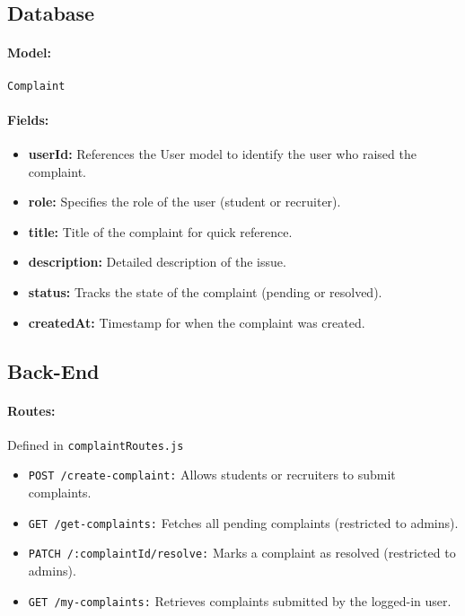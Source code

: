 \subsection*{Database}
\paragraph{Model:} \texttt{Complaint}
\paragraph{Fields:}
\begin{itemize}
    \item \textbf{userId:} References the User model to identify the user who raised the complaint.
    \item \textbf{role:} Specifies the role of the user (student or recruiter).
    \item \textbf{title:} Title of the complaint for quick reference.
    \item \textbf{description:} Detailed description of the issue.
    \item \textbf{status:} Tracks the state of the complaint (pending or resolved).
    \item \textbf{createdAt:} Timestamp for when the complaint was created.
\end{itemize}

\subsection*{Back-End}
\paragraph{Routes:} Defined in \texttt{complaintRoutes.js}
\begin{itemize}
    \item \texttt{POST /create-complaint:} Allows students or recruiters to submit complaints.
    \item \texttt{GET /get-complaints:} Fetches all pending complaints (restricted to admins).
    \item \texttt{PATCH /:complaintId/resolve:} Marks a complaint as resolved (restricted to admins).
    \item \texttt{GET /my-complaints:} Retrieves complaints submitted by the logged-in user.
\end{itemize}

